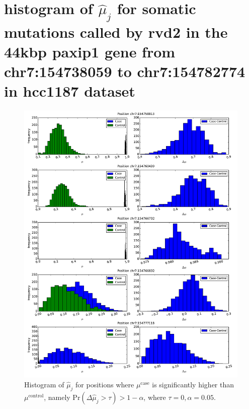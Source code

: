 \documentclass[11pt,reqno]{amsart}
\begin{document}
\section{histogram of $ \hat{\mu}_j $ for somatic mutations called by rvd2 in the 44kbp paxip1 gene from chr7:154738059 to chr7:154782774 in hcc1187 dataset}
\begin{figure}[H]
\begin{center}
\includegraphics[width=120mm]{pdf_figs/HCC1187_histogram_pos.pdf}
\caption{Histogram of $ \hat{\mu}_j $ for positions where $\mu^{\text{case}}$ is significantly higher than $ \mu^{\text{control}}$, namely Pr$ (\Delta \hat{\mu}_j> \tau) > 1- \alpha $, where $ \tau=0, \alpha=0.05 $.} 
\label{fig:hist_pos}
\end{center}
\end{figure}
\end{document}
